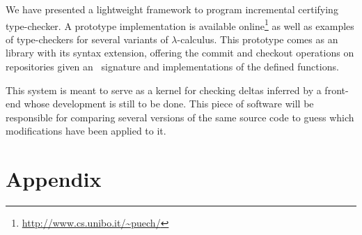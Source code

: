 \documentclass{llncs}
\begin{document}
We have presented a lightweight framework to program incremental
certifying type-checker. A prototype implementation is available
online\footnote{\url{http://www.cs.unibo.it/~puech/}} as well as
examples of type-checkers for several variants of
$\lambda$-calculus. This prototype comes as an  library
with its  syntax extension, offering the commit and
checkout operations on repositories given an \LF\ signature and
 implementations of the defined functions.

This system is meant to serve as a kernel for checking deltas inferred
by a front-end whose development is still to be done. This piece of
software will be responsible for comparing several versions of the same
source code to guess which modifications have been applied to it.







\pagebreak
\appendix
\section{Appendix}
\end{document}
